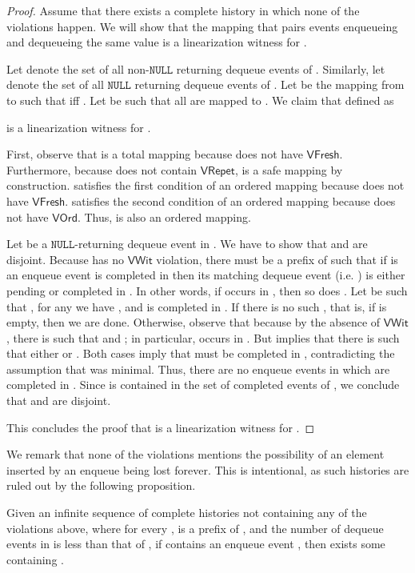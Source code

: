 \documentclass{LMCS}
\newcommand{\NULL}{\ensuremath{\mathtt{NULL}}}
\newcommand{\VFresh}{\ensuremath{\mathsf{VFresh}}}
\newcommand{\VRepet}{\ensuremath{\mathsf{VRepet}}}
\newcommand{\VOrd}{\ensuremath{\mathsf{VOrd}}}
\newcommand{\VWit}{\ensuremath{\mathsf{VWit}}}
\begin{document}
\begin{proof}
\noindent{\bf()} 
Assume that there exists a complete history  in which none of the violations happen.
We will show that the mapping that pairs events enqueueing and dequeueing the same value is a linearization witness for .

Let  denote the set of all {non-\NULL} returning dequeue events of .
Similarly, let  denote the set of all {\NULL} returning dequeue events of .
Let  be the mapping from  to  such that  iff . 
Let  be such that all  are mapped to .
We claim that  defined as 

is a linearization witness for .

First, observe that  is a total mapping because  does not have {\VFresh}.
Furthermore, because  does not contain {\VRepet},  is a safe mapping by construction.
 satisfies the first condition of an ordered mapping because  does not have {\VFresh}.
 satisfies the second condition of an ordered mapping because  does not have {\VOrd}.
Thus,  is also an ordered mapping.

Let  be a {\NULL}-returning dequeue event in .
We have to show that  and  are disjoint.
Because  has no {\VWit} violation, there must be a prefix  of  such that if  is an enqueue event is completed in  then its matching dequeue event  (i.e. ) is either pending or completed in .
In other words, if  occurs in , then so does .
Let  be such that , for any  we have , and  is completed in .
If there is no such , that is, if  is empty, then we are done.
Otherwise, observe that  because by the absence of {\VWit}, there is  such that  and ; in particular,  occurs in .
But  implies that there is  such that either  or .
Both cases imply that  must be completed in , contradicting the assumption that  was minimal.
Thus, there are no enqueue events in  which are completed in .
Since  is contained in the set of completed events of , we conclude that  and  are disjoint.

This concludes the proof that  is a linearization witness for .
\end{proof}

We remark that none of the violations  mentions the possibility of an
element inserted by an enqueue being lost forever.  This is intentional, as
such histories are ruled out by the following proposition.

\begin{prop}
Given an infinite sequence of complete histories  
not containing any of the violations above, 
where for every ,  is a prefix of
, and the number of dequeue events in  is less than that of ,
if  contains an enqueue event ,
then exists some  containing .
\end{prop}
\end{document}
